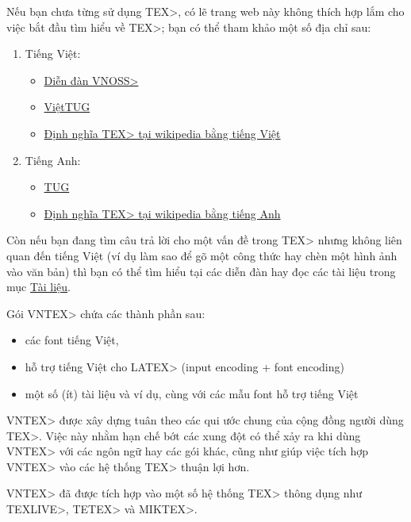 \documentclass[12pt,a4paper]{article}
\begin{document}
Nếu bạn chưa từng sử dụng \<TEX>, có lẽ trang web này không
thích hợp lắm cho việc bắt đầu tìm hiểu về \<TEX>; bạn có thể
tham khảo một số địa chỉ sau:
\begin{enumerate}
\item Tiếng Việt:
\begin{itemize}
\item \href{http://forum.vnoss.org/viewforum.php?id=10}{Diễn đàn \<VNOSS>}
\item \href{http://viettug.org}{ViệtTUG}
\item \href{http://vi.wikipedia.org/wiki/TeX}{Định nghĩa \<TEX> tại
wikipedia bằng tiếng Việt} 
\end{itemize}
\item Tiếng Anh:
\begin{itemize}
\item \href{http://tug.org}{TUG}
\item \href{http://en.wikipedia.org/wiki/TeX}{Định nghĩa \<TEX> tại
wikipedia bằng tiếng Anh}
\end{itemize}
\end{enumerate}

Còn nếu bạn đang tìm câu trả lời cho một vấn đề trong \<TEX> nhưng không
liên quan đến tiếng Việt (ví dụ làm sao để gõ một công thức hay chèn một
hình ảnh vào văn bản) thì bạn có thể tìm hiểu tại các diễn đàn hay
đọc các tài liệu trong mục \hyperlink{tro-giup}{Tài liệu}.

Gói \<VNTEX> chứa các thành phần sau:
\begin{itemize}
\item các font tiếng Việt,
\item hỗ trợ tiếng Việt cho \<LATEX> (input encoding + font encoding)
\item một số (ít) tài liệu và ví dụ, cùng với các mẫu font hỗ trợ tiếng
Việt
\end{itemize}

\<VNTEX> được xây dựng tuân theo các qui ước chung của cộng đồng người dùng
\<TEX>. Việc này nhằm hạn chế bớt các xung đột có thể xảy ra khi dùng
\<VNTEX> với các ngôn ngữ hay các gói khác, cũng như giúp việc tích hợp
\<VNTEX> vào các hệ thống \<TEX> thuận lợi hơn.

\<VNTEX> đã được tích hợp vào một số hệ thống \<TEX> thông dụng như
\<TEXLIVE>, \<TETEX> và \<MIKTEX>.
\end{document}
